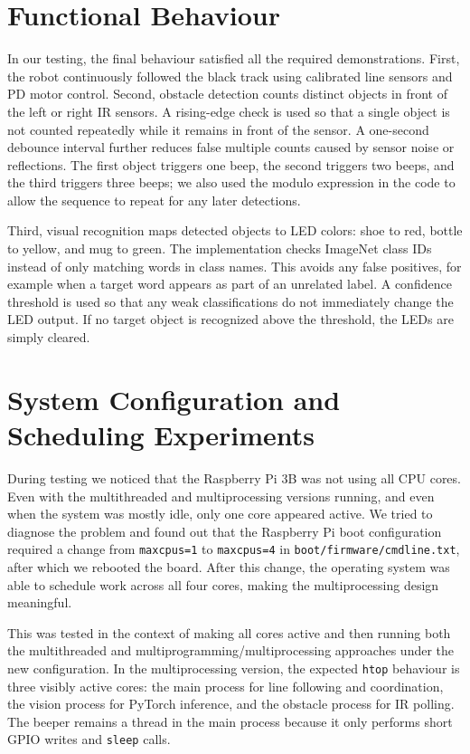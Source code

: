 \documentclass[10pt,a4paper]{article}
\begin{document}
\section{Functional Behaviour}
In our testing, the final behaviour satisfied all the required demonstrations. First, the robot continuously followed the black track using calibrated line sensors and PD motor control. Second, obstacle detection counts distinct objects in front of the left or right IR sensors. A rising-edge check is used so that a single object is not counted repeatedly while it remains in front of the sensor. A one-second debounce interval further reduces false multiple counts caused by sensor noise or reflections. The first object triggers one beep, the second triggers two beeps, and the third triggers three beeps; we also used the modulo expression in the code to allow the sequence to repeat for any later detections.

Third, visual recognition maps detected objects to LED colors: shoe to red, bottle to yellow, and mug to green. The implementation checks ImageNet class IDs instead of only matching words in class names. This avoids any false positives, for example when a target word appears as part of an unrelated label. A confidence threshold is used so that any weak classifications do not immediately change the LED output. If no target object is recognized above the threshold, the LEDs are simply cleared.

\newpage
\section{System Configuration and Scheduling Experiments}
During testing we noticed that the Raspberry Pi 3B was not using all CPU cores. Even with the multithreaded and multiprocessing versions running, and even when the system was mostly idle, only one core appeared active. We tried to diagnose the problem and found out that the Raspberry Pi boot configuration required a change from \texttt{maxcpus=1} to \texttt{maxcpus=4} in \texttt{boot/firmware/cmdline.txt}, after which we rebooted the board. After this change, the operating system was able to schedule work across all four cores, making the multiprocessing design meaningful.

This was tested in the context of making all cores active and then running both the multithreaded and multiprogramming/multiprocessing approaches under the new configuration. In the multiprocessing version, the expected \texttt{htop} behaviour is three visibly active cores: the main process for line following and coordination, the vision process for PyTorch inference, and the obstacle process for IR polling. The beeper remains a thread in the main process because it only performs short GPIO writes and \texttt{sleep} calls.
\end{document}
